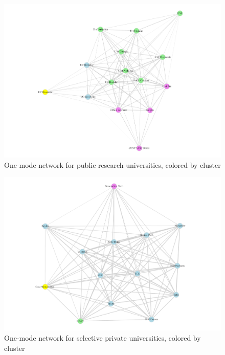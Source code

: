 \documentclass[
  12pt,
]{article}
\begin{document}
\begin{landscape}
\newpage

\begin{figure}

{\centering \includegraphics[width=2\linewidth]{./plot_1mode_pubu} 

}

\caption{One-mode network for public research universities, colored by cluster}\label{fig:plot-1mode-pubu}
\end{figure}

\begin{figure}

{\centering \includegraphics[width=2\linewidth]{./plot_1mode_privu} 

}

\caption{One-mode network for selective private universities, colored by cluster}\label{fig:plot-1mode-privu}
\end{figure}


\end{landscape}
\end{document}
